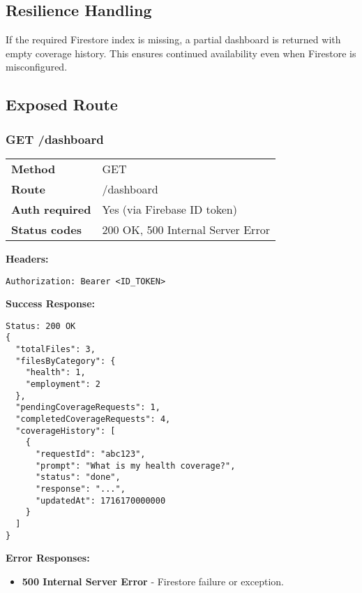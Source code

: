 \subsection*{Resilience Handling}

If the required Firestore index is missing, a partial dashboard is returned with empty coverage history. This ensures continued availability even when Firestore is misconfigured.

\subsection*{Exposed Route}

\subsubsection*{GET /dashboard}

\begin{tabular}{>{\bfseries}l l}
\toprule
Method & GET \\
Route & /dashboard \\
Auth required & Yes (via Firebase ID token) \\
Status codes & 200 OK, 500 Internal Server Error \\
\bottomrule
\end{tabular}

\vspace{1em}
\textbf{Headers:}
\begin{verbatim}
Authorization: Bearer <ID_TOKEN>
\end{verbatim}

\vspace{1em}
\textbf{Success Response:}
\begin{verbatim}
Status: 200 OK
{
  "totalFiles": 3,
  "filesByCategory": {
    "health": 1,
    "employment": 2
  },
  "pendingCoverageRequests": 1,
  "completedCoverageRequests": 4,
  "coverageHistory": [
    {
      "requestId": "abc123",
      "prompt": "What is my health coverage?",
      "status": "done",
      "response": "...",
      "updatedAt": 1716170000000
    }
  ]
}
\end{verbatim}

\vspace{1em}
\textbf{Error Responses:}
\begin{itemize}
    \item \textbf{500 Internal Server Error} - Firestore failure or exception.
\end{itemize}
